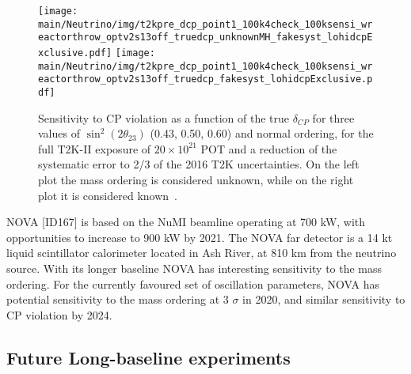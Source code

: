 \begin{figure} [htbp!]
\begin{center}
\texttt{[image: \\main/Neutrino/img/t2kpre\_dcp\_point1\_100k4check\_100ksensi\_wreactorthrow\_optv2s13off\_truedcp\_unknownMH\_fakesyst\_lohidcpExclusive.pdf]}
\texttt{[image: \\main/Neutrino/img/t2kpre\_dcp\_point1\_100k4check\_100ksensi\_wreactorthrow\_optv2s13off\_truedcp\_fakesyst\_lohidcpExclusive.pdf]}
\caption{\label{fig:t2k2sensi} Sensitivity to CP violation as a function of the true
$\delta_{CP}$ for three values of $\sin^2 (2 \theta_{23})$ (0.43, 0.50, 0.60) and normal ordering, for the full T2K-II exposure of $20\times 10^{21}$ POT and a reduction of the systematic error to 2/3 of the 2016 T2K uncertainties. On the left plot the mass ordering is considered unknown, while on the right plot it is considered known~\cite{Abe:2016tez}.}
\end{center}
\end{figure}


NOVA [ID167] %
is based on the NuMI beamline operating at 700 kW, with opportunities to increase to 900 kW by 2021. The NOVA far detector is a 14 kt liquid scintillator calorimeter located in Ash River, at 810 km from the neutrino source. With its longer baseline NOVA has interesting sensitivity to the mass ordering. For the currently favoured set of oscillation parameters, NOVA has potential sensitivity to the mass ordering at 3 $\sigma$ in 2020, and similar sensitivity to CP violation by 2024. %


\subsection{Future Long-baseline experiments}

